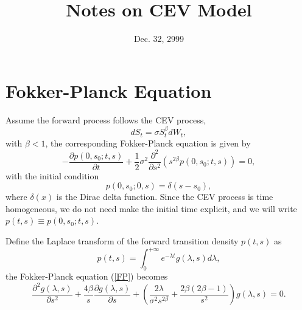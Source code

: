 \documentclass[12pt]{article}
\begin{document}
\title{Notes on CEV Model}
\date{Dec. 32, 2999}

\maketitle

\section{Fokker-Planck Equation}

  Assume the forward process follows the CEV process,
  \begin{equation}
    dS_t=\sigma S_t^{\beta}dW_t,
    \label{CEV}
  \end{equation}
  with $\beta < 1$, the corresponding Fokker-Planck equation is given by
  \begin{equation}
    -\frac{\partial p(0,s_0;t,s)}{\partial t}+\frac{1}{2}\sigma^2\frac{\partial^2}{\partial s^2}
    \left(s^{2\beta}p(0,s_0;t,s)\right) = 0,
    \label{FP}
  \end{equation}
  with the initial condition
  \begin{equation}
    p(0,s_0;0,s) = \delta(s-s_0),
    \label{initial}
  \end{equation}
  where $\delta(x)$ is the Dirac delta function. Since the CEV process is time homogeneous, we do not need
  make the initial time explicit, and we will write $p(t,s)\equiv p(0,s_0;t,s)$.

  Define the Laplace transform of the forward transition density $p(t,s)$ as \cite{Lesniewski}
  \begin{equation}
    p(t,s)=\int_0^{+\infty}e^{-\lambda t}g(\lambda, s)d\lambda,
    \label{Laplace}
  \end{equation}
  the Fokker-Planck equation (\ref{FP}) becomes
  \begin{equation}
    \frac{\partial^2g(\lambda,s)}{\partial s^2}+\frac{4\beta}{s}\frac{\partial g(\lambda,s)}{\partial s}
    + \left(\frac{2\lambda}{\sigma^2 s^{2\beta}}+\frac{2\beta(2\beta-1)}{s^2}\right)g(\lambda, s) = 0.
    \label{FP2}
  \end{equation}
\end{document}
